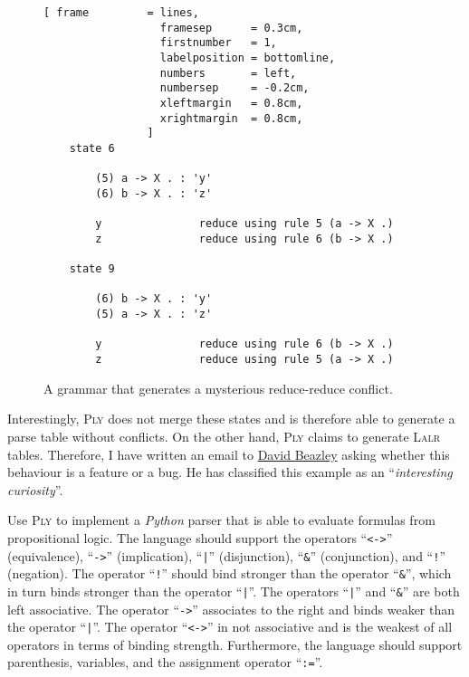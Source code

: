 \begin{figure}[!ht]
\centering
\begin{Verbatim}[ frame         = lines, 
                  framesep      = 0.3cm, 
                  firstnumber   = 1,
                  labelposition = bottomline,
                  numbers       = left,
                  numbersep     = -0.2cm,
                  xleftmargin   = 0.8cm,
                  xrightmargin  = 0.8cm,
                ]
    state 6
    
        (5) a -> X . : 'y'
        (6) b -> X . : 'z'
    
        y               reduce using rule 5 (a -> X .)
        z               reduce using rule 6 (b -> X .)

    state 9
    
        (6) b -> X . : 'y'
        (5) a -> X . : 'z'
    
        y               reduce using rule 6 (b -> X .)
        z               reduce using rule 5 (a -> X .)
\end{Verbatim}
\vspace*{-0.3cm}
\caption{A grammar that generates a mysterious reduce-reduce conflict.}
\label{fig:Mysterious-Conflicts.parser.out}
\end{figure}
\vspace*{0.3cm}

Interestingly, \textsc{Ply} does not merge these states and is therefore able to generate a parse table without
conflicts.  On the other hand, \textsc{Ply} claims to generate \textsc{Lalr} tables.  Therefore, I have written an
email to \href{https://en.wikipedia.org/wiki/David_M._Beazley}{David Beazley} asking whether this behaviour is
a feature or a bug.  He has classified this example as an ``\emph{interesting curiosity}''.


\exerciseEng
Use \textsc{Ply} to implement a \textsl{Python} parser that is able to evaluate formulas from propositional logic.
The language should support the operators ``\texttt{<->}'' (equivalence), ``\texttt{->}'' (implication),
``\texttt{|}'' (disjunction), ``\texttt{\&}'' (conjunction), and 
``\texttt{!}'' (negation).  The operator ``\texttt{!}'' should bind stronger than the operator ``\texttt{\&}'',
which in turn binds stronger than the operator ``\texttt{|}''.  The operators ``\texttt{|}'' and ``\texttt{\&}''
are both left associative.  The operator ``\texttt{->}'' associates to the right and binds weaker than the
operator ``\texttt{|}''. 
The operator ``\texttt{<->}'' in not associative and is the weakest of all operators in terms of binding strength.
Furthermore, the language should support parenthesis, variables, and the assignment operator ``\texttt{:=}''.  \eox


